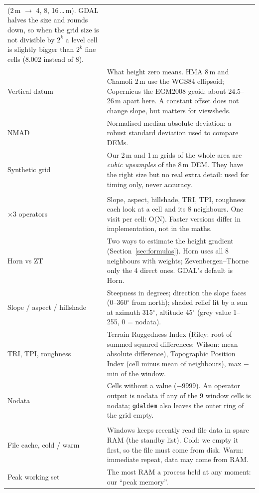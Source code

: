 ﻿\documentclass[11pt,a4paper]{article}
\newcommand{\code}[1]{\texttt{#1}}
\begin{document}
\begin{longtable}{>{\raggedright\arraybackslash}p{3.4cm}>{\raggedright\arraybackslash}p{12.0cm}}
(2\,m $\to$ 4, 8, 16\,\dots\,m). GDAL halves the size and rounds down, so when the grid size is not divisible by $2^k$
a level cell is slightly bigger than $2^k$ fine cells (8.002 instead of 8). \\
Vertical datum & What height zero means. HMA 8\,m and Chamoli 2\,m use the WGS84 ellipsoid; Copernicus the EGM2008
geoid: about 24.5--26\,m apart here. A constant offset does not change slope, but matters for viewsheds. \\
NMAD & Normalised median absolute deviation: a robust standard deviation used to compare DEMs. \\
Synthetic grid & Our 2\,m and 1\,m grids of the whole area are \emph{cubic upsamples} of the 8\,m DEM. They have the right
size but no real extra detail: used for timing only, never accuracy. \\
\midrule
\multicolumn{2}{l}{\textit{Terrain operators}} \\
3$\times$3 operators & Slope, aspect, hillshade, TRI, TPI, roughness each look at a cell and its 8 neighbours. One
visit per cell: O(N). Faster versions differ in implementation, not in the maths. \\
Horn vs ZT & Two ways to estimate the height gradient (Section~\ref{sec:formulas}). Horn uses all 8 neighbours with
weights; Zevenbergen--Thorne only the 4 direct ones. GDAL's default is Horn. \\
Slope / aspect / hillshade & Steepness in degrees; direction the slope faces (0--360$^\circ$ from north); shaded relief
lit by a sun at azimuth 315$^\circ$, altitude 45$^\circ$ (grey value 1--255, 0 = nodata). \\
TRI, TPI, roughness & Terrain Ruggedness Index (Riley: root of summed squared differences; Wilson: mean absolute
difference), Topographic Position Index (cell minus mean of neighbours), max $-$ min of the window. \\
Nodata & Cells without a value ($-9999$). An operator output is nodata if any of the 9 window cells is nodata;
\code{gdaldem} also leaves the outer ring of the grid empty. \\
\midrule
\multicolumn{2}{l}{\textit{Measurement}} \\
File cache, cold / warm & Windows keeps recently read file data in spare RAM (the standby list). Cold: we empty it
first, so the file must come from disk. Warm: immediate repeat, data may come from RAM. \\
Peak working set & The most RAM a process held at any moment: our ``peak memory''. \\

\end{longtable}
\end{document}
